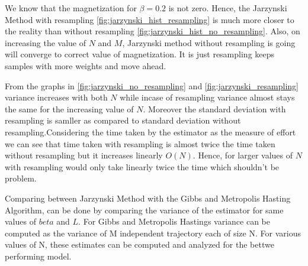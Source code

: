 \documentclass[11pt]{article}
\begin{document}
\noindent We know that the magnetization for $\beta = 0.2$ is not zero. Hence, the Jarzynski Method with resampling \ref{fig:jarzynski_hist_resampling} is much more closer to the reality than without 
resampling \ref{fig:jarzynski_hist_no_resampling}. Also, on increasing the value of $N$ and $M$, Jarzynski method without resampling is going will converge to correct value of magnetization. It is just resampling keeps samples with more weights and move ahead.
\par
\noindent From the graphs in \ref{fig:jarzynski_no_resampling} and \ref{fig:jarzynski_resampling} variance increases with both $N$ while incase of resampling variance almost stays the same for the increasing value of $N$. 
Moreover the standard deviation with resampling is samller as compared to standard deviation without resampling.Considering 
the time taken by the estimator as the measure of effort we can see that time taken with resampling is almost twice the time taken without resampling but it increases linearly $O(N)$.
Hence, for larger values of $N$ with resampling would only take linearly twice the time which shouldn't be problem.
\par
\noindent Comparing between Jarzynski Method with the Gibbs and Metropolis Hasting Algorithm, can be done by comparing the variance of the estimator for same values of $beta$ and $L$. For Gibbs and Metropolis Hastings variance can be computed as the variance of M independent trajectory each of size N. For various values of N, these estimates can 
be computed and analyzed for the bettwe performing model.
\end{document}
